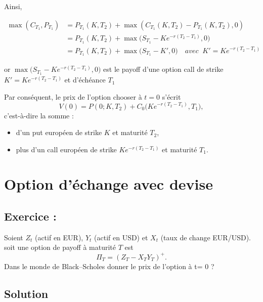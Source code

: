 Ainsi,

\begin{align*}
\max(C_{T_1},P_{T_1}) &= P_{T_1}(K , T_2) + \max(C_{T_1}(K,T_2) - P_{T_1}(K,T_2),0)\\
&= P_{T_1}(K,T_2) + \max\Big(S_{T_1} - K e^{-r(T_2-T_1)} , 0 \Big) \\
&= P_{T_1}(K,T_2) + \max\Big(S_{T_1} - K' , 0 \Big) \quad avec \; \; K'= K e^{-r(T_2-T_1)}
\end{align*}


or 
$\max\Big(S_{T_1} - K e^{-r(T_2-T_1)} , 0 \Big)$ est le payoff d'une option call de strike $K' = K e^{-r(T_2-T_1)}$ et d'échéance $T_1$

Par conséquent, le prix de l’option chooser à $t=0$ s’écrit
\[
V(0) = P(0;K,T_2) + C_0\big(K e^{-r(T_2-T_1)},T_1\big),
\]
c’est-à-dire la somme :
\begin{itemize}
    \item d’un put européen de strike $K$ et maturité $T_2$, 
    \item plus d’un call européen de strike $K e^{-r(T_2-T_1)}$ et maturité $T_1$.
\end{itemize}



\section{Option d'échange avec devise}

\subsection*{Exercice :}

\begin{exerciseBox}
Soient $Z_t$ (actif en EUR), $Y_t$ (actif en USD) et $X_t$ (taux de change EUR/USD). \\ 
soit une option de payoff à maturité $T$ est 
\[
\Pi_T=(Z_T - X_T Y_T)^+.
\]
Dans le monde de Black–Scholes  donner le prix de l'option à t= 0 ? 
\end{exerciseBox}


\subsection*{Solution}


